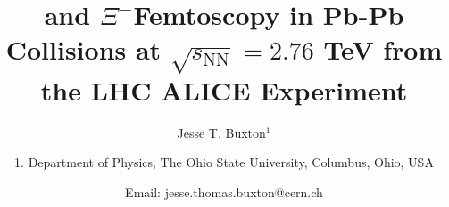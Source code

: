 \documentclass[ALICE,manyauthors]{ALICE_analysis_notes}
\begin{document}
%
%
%
\begin{titlepage}
%
\PHdate{\today}
%
\title{\LamK and $\Xi^{-}$\Kpm Femtoscopy in Pb-Pb Collisions at $\sqrt{s_{\mathrm{NN}}}=2.76$ TeV from the LHC ALICE Experiment}
%
\author{Jesse T. Buxton$^{1}$}
\author{
1. Department of Physics, The Ohio State University, Columbus, Ohio, USA\\
}
\author{Email: jesse.thomas.buxton@cern.ch}
%
%
\begin{abstract}

\begin{comment}
My abstract will be contained here.  The abstract will introduce my study and inform the reader about the content of this paper.  I will state the problem I tackle, and summarize (in one sentence) why no one else has yet to adequately answered the research question.  Next, I will explain (again, in one sentence) how I tackled the research question, and (in one sentence) how I went about doing the research which followed from this big idea (i.e. elaborate on previous sentence).  Finally, as a single sentence, I will state the key impact of my research.
\end{comment}

\linenumbers

\begin{comment}
We present results from a femtoscopic analysis of \LamK and $\Xi^{-}$\Kpm correlations in Pb-Pb collisions at $\sqrt{s_{\mathrm{NN}}}$ = 2.76 TeV by the ALICE experiment at the LHC.  
All pair combinations of \Lam and \ALam with \KchP, \KchM and \Ks are analyzed.  
The femtoscopic correlations are the result of strong final-state interactions, and are fit with a parametrization based on a model by R. Lednicky and V. L. Lyuboshitz \cite{Lednicky:82}.  
This allows us to both characterize the emission source and measure the scattering parameters for the particle pairs.  
We observe a large difference in the \LamKchP and \LamKchM correlations in pairs with low relative momenta (\kstar $\lesssim$ 100 MeV).   
The results suggest an effect arising from different quark-antiquark interactions in the pairs, i.e. $\rm s\bar{s}$ in \LamKchP and $\rm u\bar{u}$ in \LamKchM, or from different net strangeness for each system.  
To gain further insight into this hypothesis, we currently are conducting a $\Xi$K femtoscopic analysis.
\end{comment}


\end{abstract}
\end{titlepage}
\end{document}
